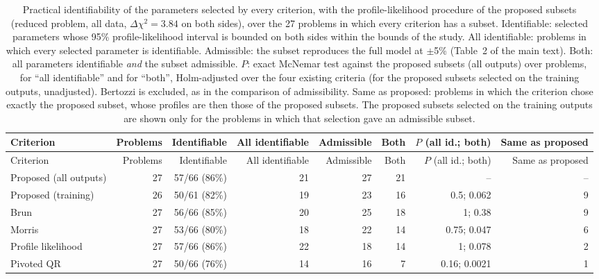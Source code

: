 \begin{longtable}{@{}lrrrrrrr@{}}
\caption{Practical identifiability of the parameters selected by every criterion, with the profile-likelihood procedure of the proposed subsets (reduced problem, all data, $\Delta\chi^2=3.84$ on both sides), over the 27 problems in which every criterion has a subset. Identifiable: selected parameters whose 95\% profile-likelihood interval is bounded on both sides within the bounds of the study. All identifiable: problems in which every selected parameter is identifiable. Admissible: the subset reproduces the full model at $\pm$5\% (Table~2 of the main text). Both: all parameters identifiable \emph{and} the subset admissible. $P$: exact McNemar test against the proposed subsets (all outputs) over problems, for ``all identifiable'' and for ``both'', Holm-adjusted over the four existing criteria (for the proposed subsets selected on the training outputs, unadjusted). Bertozzi is excluded, as in the comparison of admissibility. Same as proposed: problems in which the criterion chose exactly the proposed subset, whose profiles are then those of the proposed subsets. The proposed subsets selected on the training outputs are shown only for the problems in which that selection gave an admissible subset.}\label{tab:identifcrit}\\
\toprule
Criterion & Problems & Identifiable & All identifiable & Admissible & Both & $P$ (all id.; both) & Same as proposed \\
\midrule
\endfirsthead
\toprule
Criterion & Problems & Identifiable & All identifiable & Admissible & Both & $P$ (all id.; both) & Same as proposed \\
\midrule
\endhead
Proposed (all outputs) & 27 & 57/66 (86\%) & 21 & 27 & 21 & -- & -- \\
Proposed (training) & 26 & 50/61 (82\%) & 19 & 23 & 16 & 0.5; 0.062 & 9 \\
Brun & 27 & 56/66 (85\%) & 20 & 25 & 18 & 1; 0.38 & 9 \\
Morris & 27 & 53/66 (80\%) & 18 & 22 & 14 & 0.75; 0.047 & 6 \\
Profile likelihood & 27 & 57/66 (86\%) & 22 & 18 & 14 & 1; 0.078 & 2 \\
Pivoted QR & 27 & 50/66 (76\%) & 14 & 16 & 7 & 0.16; 0.0021 & 1 \\
\bottomrule
\end{longtable}
